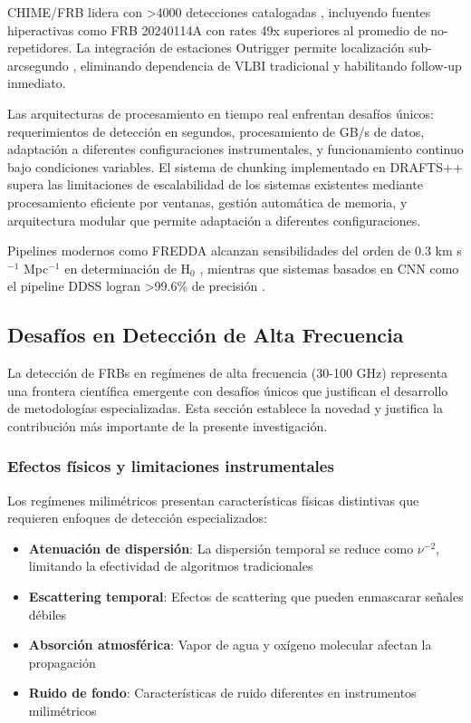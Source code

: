 CHIME/FRB lidera con >4000 detecciones catalogadas \cite{shin2025chimefrbdiscoveryextremelyactive}, incluyendo fuentes hiperactivas como FRB 20240114A con rates 49x superiores al promedio de no-repetidores. La integración de estaciones Outrigger permite localización sub-arcsegundo \cite{lanman2024chimefrboutriggerskkostation}, eliminando dependencia de VLBI tradicional y habilitando follow-up inmediato.

Las arquitecturas de procesamiento en tiempo real enfrentan desafíos únicos: requerimientos de detección en segundos, procesamiento de GB/s de datos, adaptación a diferentes configuraciones instrumentales, y funcionamiento continuo bajo condiciones variables. El sistema de chunking implementado en DRAFTS++ supera las limitaciones de escalabilidad de los sistemas existentes mediante procesamiento eficiente por ventanas, gestión automática de memoria, y arquitectura modular que permite adaptación a diferentes configuraciones.

Pipelines modernos como FREDDA alcanzan sensibilidades del orden de 0.3 km s$^{-1}$ Mpc$^{-1}$ en determinación de H$_0$ \cite{freda2025}, mientras que sistemas basados en CNN como el pipeline DDSS logran >99.6\% de precisión \cite{ddss2025}.

\subsection{Desafíos en Detección de Alta Frecuencia}

La detección de FRBs en regímenes de alta frecuencia (30-100 GHz) representa una frontera científica emergente con desafíos únicos que justifican el desarrollo de metodologías especializadas. Esta sección establece la novedad y justifica la contribución más importante de la presente investigación.

\subsubsection{Efectos físicos y limitaciones instrumentales}

Los regímenes milimétricos presentan características físicas distintivas que requieren enfoques de detección especializados:

\begin{itemize}
    \item \textbf{Atenuación de dispersión}: La dispersión temporal se reduce como $\nu^{-2}$, limitando la efectividad de algoritmos tradicionales
    \item \textbf{Escattering temporal}: Efectos de scattering que pueden enmascarar señales débiles
    \item \textbf{Absorción atmosférica}: Vapor de agua y oxígeno molecular afectan la propagación
    \item \textbf{Ruido de fondo}: Características de ruido diferentes en instrumentos milimétricos
\end{itemize}

